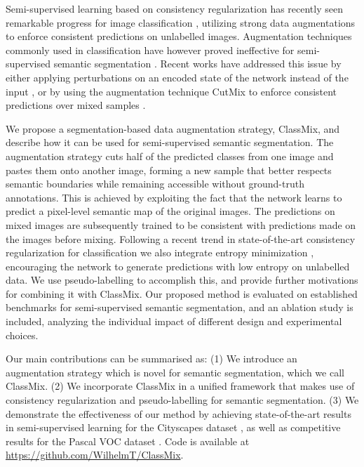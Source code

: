 \documentclass[10pt,twocolumn,letterpaper]{article}
\begin{document}
Semi-supervised learning based on consistency regularization has recently seen remarkable progress for image classification \cite{xie2019unsupervised,FixMatch}, utilizing strong data augmentations to enforce consistent predictions on unlabelled images. Augmentation techniques commonly used in classification have however proved ineffective for semi-supervised semantic segmentation \cite{French,ouali2020semisupervised}. Recent works have addressed this issue by either applying perturbations on an encoded state of the network instead of the input \cite{ouali2020semisupervised}, or by using the augmentation technique CutMix \cite{CutMix} to enforce consistent predictions over mixed samples \cite{French,StructuredLoss}. 

We propose a segmentation-based data augmentation strategy, ClassMix, and describe how it can be used for semi-supervised semantic segmentation. The augmentation strategy cuts half of the predicted classes from one image and pastes them onto another image, forming a new sample that better respects semantic boundaries while remaining accessible without ground-truth annotations. This is achieved by exploiting the fact that the network learns to predict a pixel-level semantic map of the original images. The predictions on mixed images are subsequently trained to be consistent with predictions made on the images before mixing. Following a recent trend in state-of-the-art consistency regularization for classification we also integrate entropy minimization \cite{xie2019unsupervised,FixMatch,berthelot2019mixmatch,ReMixMatch}, encouraging the network to generate predictions with low entropy on unlabelled data. We use pseudo-labelling \cite{pseudo-label} to accomplish this, and provide further motivations for combining it with ClassMix. Our proposed method is evaluated on established benchmarks for semi-supervised semantic segmentation, and an ablation study is included, analyzing the individual impact of different design and experimental choices.

Our main contributions can be summarised as: (1) We introduce an augmentation strategy which is novel for semantic segmentation, which we call ClassMix. (2) We incorporate ClassMix in a unified framework that makes use of consistency regularization and pseudo-labelling for semantic segmentation. (3) We demonstrate the effectiveness of our method by achieving state-of-the-art results in semi-supervised learning for the Cityscapes dataset \cite{Cityscapes}, as well as competitive results for the Pascal VOC dataset \cite{pascal-voc-2012}. Code is available at \url{https://github.com/WilhelmT/ClassMix}.
\end{document}
